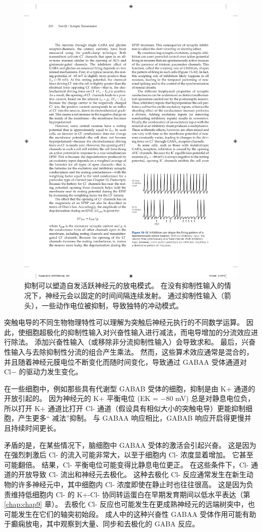 \begin{figure}[htbp]
	\centering
	\includegraphics[width=0.5\linewidth]{chap13/fig_13_12}
	\caption{抑制可以塑造自发活跃神经元的放电模式。 在没有抑制性输入的情况下，神经元会以固定的时间间隔连续发射。 通过抑制性输入（箭头），一些动作电位被抑制，导致独特的冲动模式。}
	\label{fig:13_12}
\end{figure}


突触电导的不同生物物理特性可以理解为突触后神经元执行的不同数学运算。 
因此，使细胞超极化的抑制性输入对兴奋性输入进行减法，而电导增加的分流效应进行除法。 
添加兴奋性输入（或移除非分流抑制性输入）会导致求和。 
最后，兴奋性输入与去除抑制性分流的组合产生乘法。 
然而，这些算术效应通常是混合的，并且随着神经元膜电位不断变化而随时间变化，导致通过 GABAA 受体通道对 Cl− 的驱动力发生变化。


在一些细胞中，例如那些具有代谢型 GABAB 受体的细胞，抑制是由 K+ 通道的开放引起的。 
因为神经元的 K+ 平衡电位 (EK = −80 mV) 总是对静息电位负，所以打开 K+ 通道比打开 Cl- 通道（假设具有相似大小的突触电导）更能抑制细胞，产生更多“ 减法”抑制。 与 GABAA 响应相比，GABAB 响应开启得更慢并且持续时间更长。


矛盾的是，在某些情况下，脑细胞中 GABAA 受体的激活会引起兴奋。
这是因为在强烈刺激后 Cl- 的流入可能非常大，以至于细胞内 Cl- 浓度显着增加。
它甚至可能翻倍。
结果，Cl- 平衡电位可能变得比静息电位更正。 
在这些条件下，Cl- 通道的开放导致 Cl- 流出和神经元去极化。
这种去极化 Cl- 反应通常发生在新生动物的许多神经元中，其中细胞内 Cl- 浓度即使在静止时也往往很高。 
这是因为负责维持低细胞内 Cl- 的 K+-Cl- 协同转运蛋白在早期发育期间以低水平表达（第 \ref{chap:chap9} 章）。 
去极化 Cl- 反应也可能发生在更成熟神经元的远端树突中，也可能发生在它们的轴突初始段。 
成人中的这种兴奋性 GABAA 受体作用可能有助于癫痫放电，其中观察到大量、同步和去极化的 GABA 反应。



